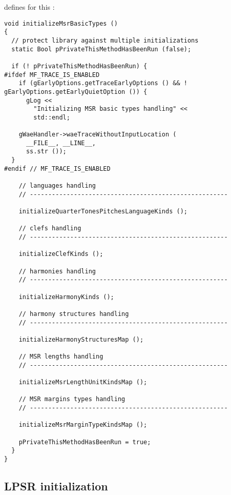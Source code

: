  defines  for this \initialization:
\begin{lstlisting}[language=CPlusPlus]
void initializeMsrBasicTypes ()
{
  // protect library against multiple initializations
  static Bool pPrivateThisMethodHasBeenRun (false);

  if (! pPrivateThisMethodHasBeenRun) {
#ifdef MF_TRACE_IS_ENABLED
    if (gEarlyOptions.getTraceEarlyOptions () && ! gEarlyOptions.getEarlyQuietOption ()) {
      gLog <<
        "Initializing MSR basic types handling" <<
        std::endl;

    gWaeHandler->waeTraceWithoutInputLocation (
      __FILE__, __LINE__,
      ss.str ());
  }
#endif // MF_TRACE_IS_ENABLED

    // languages handling
    // ------------------------------------------------------

    initializeQuarterTonesPitchesLanguageKinds ();

    // clefs handling
    // ------------------------------------------------------

    initializeClefKinds ();

    // harmonies handling
    // ------------------------------------------------------

    initializeHarmonyKinds ();

    // harmony structures handling
    // ------------------------------------------------------

    initializeHarmonyStructuresMap ();

    // MSR lengths handling
    // ------------------------------------------------------

    initializeMsrLengthUnitKindsMap ();

    // MSR margins types handling
    // ------------------------------------------------------

    initializeMsrMarginTypeKindsMap ();

    pPrivateThisMethodHasBeenRun = true;
  }
}
\end{lstlisting}


\subsection{LPSR initialization}


